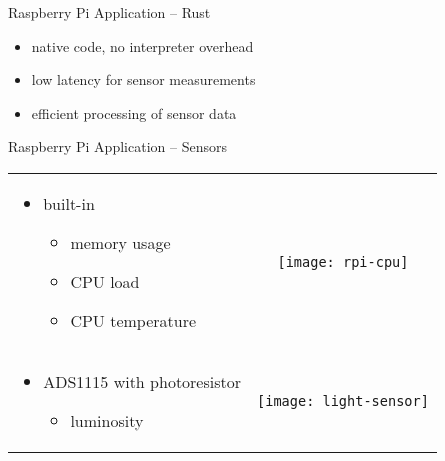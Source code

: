 \documentclass[aspectratio=1610]{beamer}
\begin{document}
  \begin{frame}{Raspberry Pi Application -- Rust}
    \begin{itemize}
      \item native code, no interpreter overhead
      \item low latency for sensor measurements
      \item efficient processing of sensor data
    \end{itemize}
  \end{frame}

  \begin{frame}{Raspberry Pi Application -- Sensors}
    \begin{tabularx}{\textwidth}{XC}
      \begin{itemize}
        \item built-in
          \begin{itemize}
            \item memory usage
            \item CPU load
            \item CPU temperature
          \end{itemize}
      \end{itemize}
      &
      \texttt{[image: rpi-cpu]}
      \\
      \begin{itemize}
        \item ADS1115 with photoresistor
          \begin{itemize}
            \item luminosity
          \end{itemize}
      \end{itemize}
      &
      \texttt{[image: light-sensor]}
    \end{tabularx}
  \end{frame}
\end{document}
